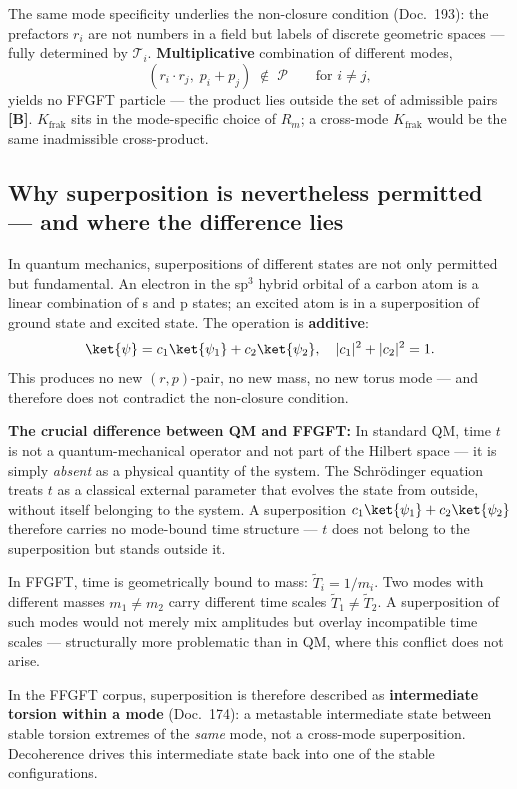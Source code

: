 The same mode specificity underlies the non-closure condition
(Doc.~193): the prefactors $r_i$ are not numbers in a field but
labels of discrete geometric spaces — fully determined by
$\mathcal{T}_i$. \textbf{Multiplicative} combination of different
modes,
\[
  (r_i\cdot r_j,\; p_i+p_j) \;\notin\; \mathcal{P}
  \qquad\text{for }i\neq j,
\]
yields no FFGFT particle — the product lies outside the set of
admissible pairs \textbf{[B]}. $K_{\text{frak}}$ sits in the
mode-specific choice of $R_m$; a cross-mode $K_{\text{frak}}$ would
be the same inadmissible cross-product.

\subsection{Why superposition is nevertheless permitted — and where the difference lies}

In quantum mechanics, superpositions of different states are not
only permitted but fundamental. An electron in the sp$^3$ hybrid
orbital of a carbon atom is a linear combination of s and p states;
an excited atom is in a superposition of ground state and excited
state. The operation is \textbf{additive}:
\[
  \ket{\psi} = c_1\ket{\psi_1} + c_2\ket{\psi_2},
  \quad |c_1|^2 + |c_2|^2 = 1.
\]
This produces no new $(r,p)$-pair, no new mass, no new torus mode —
and therefore does not contradict the non-closure condition.

\textbf{The crucial difference between QM and FFGFT:}
In standard QM, time $t$ is not a quantum-mechanical operator and
not part of the Hilbert space — it is simply \emph{absent} as a
physical quantity of the system. The Schrödinger equation treats
$t$ as a classical external parameter that evolves the state from
outside, without itself belonging to the system. A superposition
$c_1\ket{\psi_1}+c_2\ket{\psi_2}$ therefore carries no
mode-bound time structure — $t$ does not belong to the
superposition but stands outside it.

In FFGFT, time is geometrically bound to mass: $\tilde{T}_i=1/m_i$.
Two modes with different masses $m_1\neq m_2$ carry different time
scales $\tilde{T}_1\neq\tilde{T}_2$. A superposition of such modes
would not merely mix amplitudes but overlay incompatible time scales
— structurally more problematic than in QM, where this conflict does
not arise.

In the FFGFT corpus, superposition is therefore described as
\textbf{intermediate torsion within a mode} (Doc.~174): a metastable
intermediate state between stable torsion extremes of the
\emph{same} mode, not a cross-mode superposition. Decoherence drives
this intermediate state back into one of the stable configurations.

